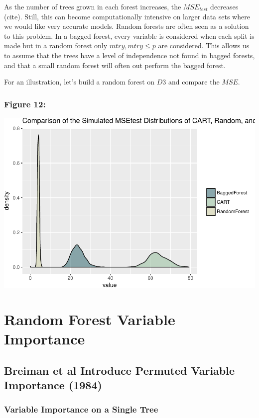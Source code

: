 \documentclass[12pt,twoside]{reedthesis}
\begin{document}
  As the number of trees grown in each forest increases, the
  \(MSE_{test}\) decreases (cite). Still, this can become computationally
  intensive on larger data sets where we would like very accurate models.
  Random forests are often seen as a solution to this problem. In a bagged
  forest, every variable is considered when each split is made but in a
  random forest only \(mtry, mtry \leq p\) are considered. This allows us
  to assume that the trees have a level of independence not found in
  bagged forests, and that a small random forest will often out perform
  the bagged forest.
  
  For an illustration, let's build a random forest on \(D3\) and compare
  the \(MSE\).
  
  \subsection{Figure 12:}\label{figure-12}
  
  \includegraphics{Thesis_files/figure-latex/fig12-1.pdf}
  
  \chapter{Random Forest Variable
  Importance}\label{random-forest-variable-importance}
  
  \section{Breiman et al Introduce Permuted Variable Importance
  (1984)}\label{breiman-et-al-introduce-permuted-variable-importance-1984}
  
  \subsection{Variable Importance on a Single
  Tree}\label{variable-importance-on-a-single-tree}
  
\end{document}
